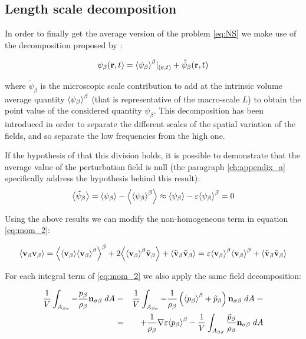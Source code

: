 \subsection{Length scale decomposition}
In order to finally get the average version of the problem \eqref{eq:NS} we make use of the decomposition proposed by \citet{gray1975derivation}:

\begin{equation}
\psi_{\beta}(\mathbf{r},t) = {\left< \psi_{\beta} \right>}^{\beta}|_{(\mathbf{r},t)} + \tilde{\psi}_{\beta}(\mathbf{r},t)
\label{eq:gray}
\end{equation}

where $\tilde{\psi}_{\beta}$ is the microscopic scale contribution to add at the intrinsic volume average quantity $ {\left< \psi_{\beta} \right>}^{\beta}$ (that is representative of the macro-scale $L$) to obtain the point value of the considered quantity $\psi_{\beta}$.
This decomposition has been introduced in order to separate the different scales of the spatial variation of the fields, and so separate the low frequencies from the high one.

If the hypothesis of that this division holds, it is possible to demonstrate that the average value of the perturbation field is null (the paragraph \ref{ch:appendix_a} specifically address the hypothesis behind this result):
$$
{\left< \tilde{\psi}_{\beta} \right>} = {\left< \psi_{\beta} \right>} - {\left< {\left< \psi_{\beta} \right>}^{\beta} \right>} \approx {\left< \psi_{\beta} \right>} -\varepsilon {\left< \psi_{\beta} \right>}^{\beta} = 0
$$


Using the above results we can modify the non-homogeneous term in equation \eqref{eq:mom_2}:

\begin{equation}
{\left< \textbf{v}_{\beta}\textbf{v}_{\beta}\right>} = {\left< {\left< \textbf{v}_{\beta} \right>}{\left< \textbf{v}_{\beta} \right>}^{\beta} \right>}^{\beta} +2{\left< {\left< \textbf{v}_{\beta} \right>}^{\beta}\tilde{\textbf{v}}_{\beta} \right>} +{\left< \tilde{\textbf{v}}_{\beta} \tilde{\textbf{v}}_{\beta} \right>} = \varepsilon {\left< \textbf{v}_{\beta}\right>}^{\beta}{\left< \textbf{v}_{\beta} \right>}^{\beta} +{\left< \tilde{\textbf{v}}_{\beta}\tilde{\textbf{v}}_{\beta} \right>}
\label{eq:dec_1}
\end{equation}

For each integral term of \ref{eq:mom_2} we also apply the same field decomposition:

\begin{eqnarray}
\dfrac{1}{V} \int_{A_{\beta \sigma}}  -\dfrac{p_{\beta}}{\rho_{\beta}} \mathbf{n}_{\sigma \beta} \;dA &=& \dfrac{1}{V} \int_{A_{\beta \sigma}}  -\dfrac{1}{\rho_{\beta}} \left({\left< p_{\beta} \right>}^{\beta}  + \tilde{p}_{\beta}\right) \mathbf{n}_{\sigma \beta} \;dA = \nonumber \\
&=& +\dfrac{1}{\rho_{\beta}}\nabla\varepsilon {\left< p_{\beta}\right>}^{\beta} - \dfrac{1}{V} \int_{A_{\beta \sigma}} \dfrac{\tilde{p}_{\beta}}{\rho_{\beta}} \mathbf{n}_{\sigma \beta} \;dA
\end{eqnarray}


